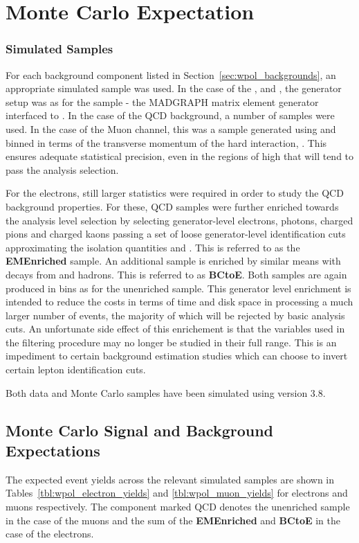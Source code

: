 \section{Monte Carlo Expectation}
\subsubsection{Simulated Samples}
For each background component listed in Section~\ref{sec:wpol_backgrounds}, an
appropriate simulated sample was used. In the case of the \Zjets, \ttbar and
\gammajets, the generator setup was as for the \Wjets sample - the \ac{MADGRAPH}
matrix element generator interfaced to \pythia. In the case of the \ac{QCD}
background, a number of samples were used. In the case of the Muon channel, this
was a sample generated using \pythia and binned in terms of the transverse
momentum of the hard interaction, \pthat. This ensures adequate statistical
precision, even in the regions of high \pthat that will tend to pass the
analysis selection.

For the electrons, still larger statistics were required in order to study the
\ac{QCD} background properties. For these, \ac{QCD} samples were further
enriched towards the analysis level selection by selecting generator-level
electrons, photons, charged pions and charged kaons passing a set of loose
generator-level identification cuts approximating the isolation quantities and
\HoverE. This is referred to as the \textbf{EMEnriched} sample. An additional
sample is enriched by similar means with decays from \Pbottom and \Pstrange
hadrons. This is referred to as \textbf{BCtoE}. Both samples are again produced
in \pthat bins as for the unenriched sample. This generator level enrichment is
intended to reduce the costs in terms of time and disk space in processing a
much larger number of events, the majority of which will be rejected by basic
analysis cuts. An unfortunate side effect of this enrichement is that the
variables used in the filtering procedure may no longer be studied in their full
range. This is an impediment to certain background estimation studies which can
choose to invert certain lepton identification cuts.

Both data and Monte Carlo samples have been simulated using \cmssw version 3.8.

\subsection{Monte Carlo Signal and Background Expectations}
\label{sec:wpol_yields}
The expected event yields across the relevant simulated samples are shown in
Tables~\ref{tbl:wpol_electron_yields} and \ref{tbl:wpol_muon_yields} for
electrons and muons respectively. The component marked \ac{QCD} denotes the
unenriched sample in the case of the muons and the sum of the
\textbf{EMEnriched} and \textbf{BCtoE} in the case of the electrons.

